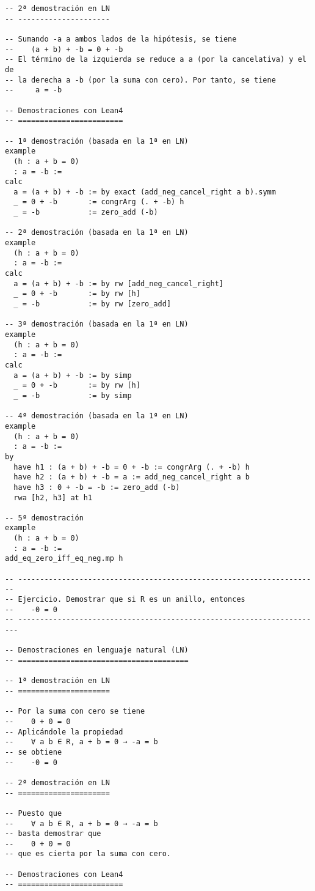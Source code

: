 \begin{verbatim}
-- 2ª demostración en LN
-- ---------------------

-- Sumando -a a ambos lados de la hipótesis, se tiene
--    (a + b) + -b = 0 + -b
-- El término de la izquierda se reduce a a (por la cancelativa) y el de
-- la derecha a -b (por la suma con cero). Por tanto, se tiene
--     a = -b

-- Demostraciones con Lean4
-- ========================

-- 1ª demostración (basada en la 1ª en LN)
example
  (h : a + b = 0)
  : a = -b :=
calc
  a = (a + b) + -b := by exact (add_neg_cancel_right a b).symm
  _ = 0 + -b       := congrArg (. + -b) h
  _ = -b           := zero_add (-b)

-- 2ª demostración (basada en la 1ª en LN)
example
  (h : a + b = 0)
  : a = -b :=
calc
  a = (a + b) + -b := by rw [add_neg_cancel_right]
  _ = 0 + -b       := by rw [h]
  _ = -b           := by rw [zero_add]

-- 3ª demostración (basada en la 1ª en LN)
example
  (h : a + b = 0)
  : a = -b :=
calc
  a = (a + b) + -b := by simp
  _ = 0 + -b       := by rw [h]
  _ = -b           := by simp

-- 4ª demostración (basada en la 1ª en LN)
example
  (h : a + b = 0)
  : a = -b :=
by
  have h1 : (a + b) + -b = 0 + -b := congrArg (. + -b) h
  have h2 : (a + b) + -b = a := add_neg_cancel_right a b
  have h3 : 0 + -b = -b := zero_add (-b)
  rwa [h2, h3] at h1

-- 5ª demostración
example
  (h : a + b = 0)
  : a = -b :=
add_eq_zero_iff_eq_neg.mp h

-- ---------------------------------------------------------------------
-- Ejercicio. Demostrar que si R es un anillo, entonces
--    -0 = 0
-- ----------------------------------------------------------------------

-- Demostraciones en lenguaje natural (LN)
-- =======================================

-- 1ª demostración en LN
-- =====================

-- Por la suma con cero se tiene
--    0 + 0 = 0
-- Aplicándole la propiedad
--    ∀ a b ∈ R, a + b = 0 → -a = b
-- se obtiene
--    -0 = 0

-- 2ª demostración en LN
-- =====================

-- Puesto que
--    ∀ a b ∈ R, a + b = 0 → -a = b
-- basta demostrar que
--    0 + 0 = 0
-- que es cierta por la suma con cero.

-- Demostraciones con Lean4
-- ========================


\end{verbatim}
